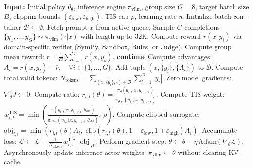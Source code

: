\begin{latin}
\begin{algorithm}[H]
\caption{OlmoRL: Group Relative Policy Optimization with Verifiable Rewards}
\label{alg:olmorl_algorithm}
\begin{algorithmic}[1]
\State \textbf{Input:} Initial policy $\theta_0$, inference engine $\pi_{\text{vllm}}$, group size $G=8$, target batch size $B$, clipping bounds $(\varepsilon_{\text{low}}, \varepsilon_{\text{high}})$, TIS cap $\rho$, learning rate $\eta$.
    \State Initialize batch container $\mathcal{B} \leftarrow \emptyset$.
        \State Fetch prompt $x$ from active queue.
        \State Sample $G$ completions $\{y_1, \dots, y_G\} \sim \pi_{\text{vllm}}(\cdot | x)$ with length up to $32\text{K}$.
            \State Compute reward $r(x, y_i)$ via domain-specific verifier (SymPy, Sandbox, Rules, or Judge).
        \EndFor
        \State Compute group mean reward: $\bar{r} = \frac{1}{G} \sum_{k=1}^G r(x, y_k)$.
            \State \textbf{continue} 
        \EndIf
        \State Compute advantages: $A_i = r(x, y_i) - \bar{r}, \quad \forall i \in \{1, \dots, G\}$.
        \State Add tuple $(x, \{y_i\}, \{A_i\})$ to $\mathcal{B}$.
    \EndWhile
    \State Compute total valid tokens: $N_{\text{tokens}} = \sum_{(x, \{y_i\}, \cdot) \in \mathcal{B}} \sum_{i=1}^G |y_i|$.
    \State Zero model gradients: $\nabla_\theta J \leftarrow 0$.
                \State Compute ratio: $r_{i,t}(\theta) = \frac{\pi_\theta(y_{i,t} | x, y_{i,<t})}{\pi_{\theta_{\text{old}}}(y_{i,t} | x, y_{i,<t})}$.
                \State Compute TIS weight: $w_{i,t}^{\text{TIS}} = \min\left( \frac{\pi(y_{i,t} | x, y_{i,<t}; \theta_{\text{old}})}{\pi_{\text{vllm}}(y_{i,t} | x, y_{i,<t}; \theta_{\text{old}})}, \, \rho \right)$.
                \State Compute clipped surrogate:
                \State \quad $\text{obj}_{i,t} = \min \left( r_{i,t}(\theta) A_i, \; \text{clip}(r_{i,t}(\theta), 1 - \varepsilon_{\text{low}}, 1 + \varepsilon_{\text{high}}) A_i \right)$.
                \State Accumulate loss: $\mathcal{L} \leftarrow \mathcal{L} - \frac{1}{N_{\text{tokens}}} w_{i,t}^{\text{TIS}} \cdot \text{obj}_{i,t}$.
            \EndFor
        \EndFor
    \EndFor
    \State Perform gradient step: $\theta \leftarrow \theta - \eta \, \text{Adam}(\nabla_\theta \mathcal{L})$.
    \State Asynchronously update inference actor weights: $\pi_{\text{vllm}} \leftarrow \theta$ without clearing KV cache.
\EndFor
\end{algorithmic}
\end{algorithm}
\end{latin}

